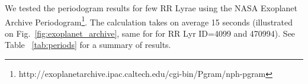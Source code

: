 \documentclass[fleqn,usenatbib]{mnras} %
\begin{document}


We tested the periodogram results for few RR Lyrae using the NASA Exoplanet Archive Periodogram\footnote{http://exoplanetarchive.ipac.caltech.edu/cgi-bin/Pgram/nph-pgram}. The calculation takes on average  15 seconds (illustrated on Fig.~\ref{fig:exoplanet_archive}, same for for RR Lyr ID=4099 and 470994). See Table ~\ref{tab:periods} for a summary of results. 
\end{document}
